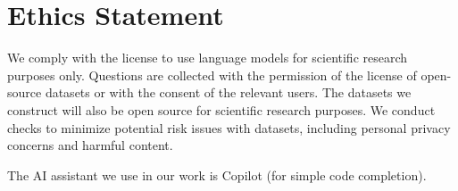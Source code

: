\section*{Ethics Statement}
\par We comply with the license to use language models for scientific research purposes only. Questions are collected with the permission of the license of open-source datasets or with the consent of the relevant users. The datasets we construct will also be open source for scientific research purposes. We conduct checks to minimize potential risk issues with datasets, including personal privacy concerns and harmful content.
\par The AI assistant we use in our work is Copilot (for simple code completion).
